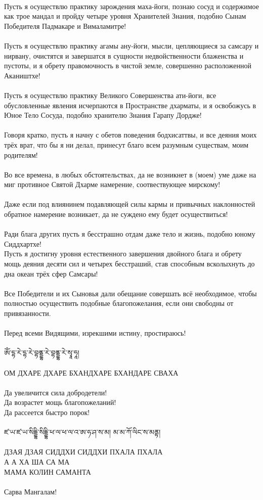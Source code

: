 \\
Пусть я осуществлю практику зарождения маха-йоги,
познаю сосуд и содержимое как трое мандал и пройду четыре
уровня Хранителей Знания, подобно Сынам Победителя
Падмакаре и Вималамитре!\\
\\
Пусть я осуществлю практику агамы ану-йоги, мысли,
цепляю\-щиеся за самсару и нирвану, очистятся и завершатся
в сущности недвойственности блаженства и пустоты,
и я обрету правомочность в чистой земле,
совершенно расположенной Акаништхе!\\
\\
Пусть я осуществлю практику Великого Совершенства ати-йоги,
все обусловленные явления исчерпаются в Пространстве дхарматы,
и я освобожусь в Юное Тело Сосуда, подобно хранителю
Знания Гарапу Дордже!\\
\\
Говоря кратко, пусть я начну с обетов поведения бодхисаттвы,
и все деяния моих трёх врат, что бы я ни делал,
принесут благо всем разумным существам, моим родителям!\\
\\
Во все времена, в любых обстоятельствах, да не возникнет
в (моем) уме даже на миг противное Святой Дхарме намерение,
соотвествующее мирскому!\\
\\
Даже если под влиянинем подавляющей силы кармы и
привыч\-ных наклонностей обратное намерение возникает,
да не сужде\-но ему будет осуществиться!\\
\\
Ради блага других пусть я бесстрашно отдам даже тело и жизнь,
подобно юному Сиддхартхе!\\
\newpage
Пусть я достигну уровня естественного завершения двойного блага
и обрету мощь деяния десяти сил и четырех бесстраший,
став способным всколыхнуть до дна океан трёх сфер Самсары!\\
\\
Все Победители и их Сыновья дали обещание совершать всё
необходимое, чтобы полностью осуществить подобные благопожелания,
если они свободны от привязанности.\\
\\
Перед всеми Видящими, изрекшими истину, простираюсь!
\\
\ti
\\
ཨོཾ་དྷ་རེ་དྷ་རེ་བྷནྡྷ་རེ་བྷནྡྷ་རེ་སྭཱ་ཧཱ། \\
\ru
\\
ОМ ДХАРЕ ДХАРЕ БХАНДХАРЕ БХАНДАРЕ СВАХА\\
\\
\noindent
Да увеличится сила добродетели!\\
Да возрастет мощь благопожеланий!\\
Да рассеется быстро порок!\\
\ti \\ ཛ་ཡ་ཛ་ཡ་སིདྡྷི་སིདྡྷི་ཕ་ལ་ཕ་ལ་འ་ཨ་ཧ་ཤ་ས་མ། མ་མ་ཀོ་ལིང་ས་མནྟ། \\
\ru \\ ДЗАЯ ДЗАЯ СИДДХИ СИДДХИ ПХАЛА ПХАЛА\\
А А ХА ША СА МА\\
МАМА КОЛИН САМАНТА\\
\\
\scriptsize
\ru Сарва Мангалам!
\normalsize
